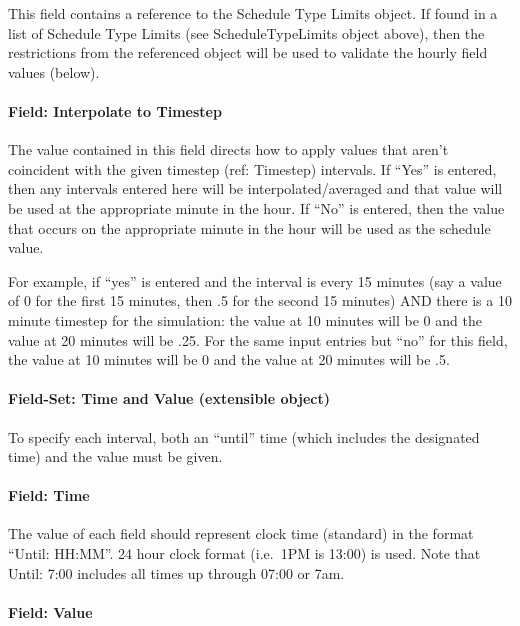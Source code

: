 This field contains a reference to the Schedule Type Limits object. If found in a list of Schedule Type Limits (see ScheduleTypeLimits object above), then the restrictions from the referenced object will be used to validate the hourly field values (below).

\paragraph{Field: Interpolate to Timestep}\label{field-interpolate-to-timestep}

The value contained in this field directs how to apply values that aren't coincident with the given timestep (ref: Timestep) intervals. If ``Yes'' is entered, then any intervals entered here will be interpolated/averaged and that value will be used at the appropriate minute in the hour. If ``No'' is entered, then the value that occurs on the appropriate minute in the hour will be used as the schedule value.

For example, if ``yes'' is entered and the interval is every 15 minutes (say a value of 0 for the first 15 minutes, then .5 for the second 15 minutes) AND there is a 10 minute timestep for the simulation: the value at 10 minutes will be 0 and the value at 20 minutes will be .25. For the same input entries but ``no'' for this field, the value at 10 minutes will be 0 and the value at 20 minutes will be .5.

\paragraph{Field-Set: Time and Value (extensible object)}\label{field-set-time-and-value-extensible-object}

To specify each interval, both an ``until'' time (which includes the designated time) and the value must be given.

\paragraph{Field: Time}\label{field-time}

The value of each field should represent clock time (standard) in the format ``Until: HH:MM''. 24 hour clock format (i.e.~1PM is 13:00) is used. Note that Until: 7:00 includes all times up through 07:00 or 7am.

\paragraph{Field: Value}\label{field-value}

